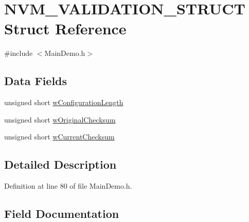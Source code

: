 \hypertarget{struct_n_v_m___v_a_l_i_d_a_t_i_o_n___s_t_r_u_c_t}{}\section{N\+V\+M\+\_\+\+V\+A\+L\+I\+D\+A\+T\+I\+O\+N\+\_\+\+S\+T\+R\+U\+C\+T Struct Reference}
\label{struct_n_v_m___v_a_l_i_d_a_t_i_o_n___s_t_r_u_c_t}


{\ttfamily \#include $<$Main\+Demo.\+h$>$}

\subsection*{Data Fields}
\begin{DoxyCompactItemize}
\item 
unsigned short \hyperlink{struct_n_v_m___v_a_l_i_d_a_t_i_o_n___s_t_r_u_c_t_a8102ecc423e38978269aae097241977d}{w\+Configuration\+Length}
\item 
unsigned short \hyperlink{struct_n_v_m___v_a_l_i_d_a_t_i_o_n___s_t_r_u_c_t_aa9ddd8c89f06a1317f4913c2b11cbfed}{w\+Original\+Checksum}
\item 
unsigned short \hyperlink{struct_n_v_m___v_a_l_i_d_a_t_i_o_n___s_t_r_u_c_t_abfa2c898374183faeb7eb95ab91d8397}{w\+Current\+Checksum}
\end{DoxyCompactItemize}


\subsection{Detailed Description}


Definition at line 80 of file Main\+Demo.\+h.



\subsection{Field Documentation}
\hypertarget{struct_n_v_m___v_a_l_i_d_a_t_i_o_n___s_t_r_u_c_t_a8102ecc423e38978269aae097241977d}{}
